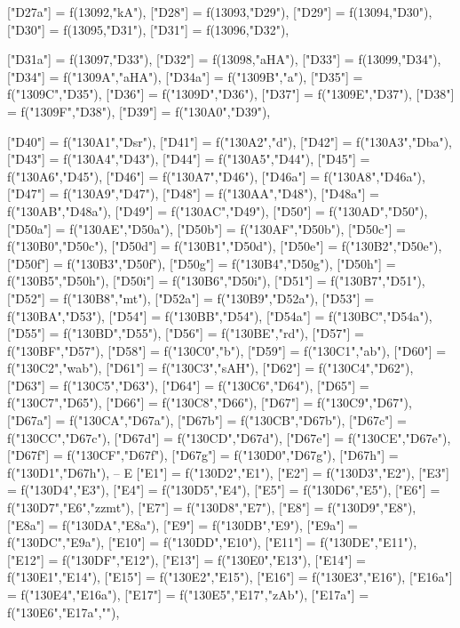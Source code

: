 \documentclass{article}
\begin{document}
\begin{luacode*}
{	["D27a"] = f(13092,"kA"),
	["D28"] = f(13093,"D29"),
	["D29"] = f(13094,"D30"),
	["D30"] = f(13095,"D31"),
	["D31"] = f(13096,"D32"),
  
	["D31a"] = f(13097,"D33"),
	["D32"] = f(13098,"aHA"),
	["D33"] = f(13099,"D34"),
	["D34"] = f("1309A","aHA"),
	["D34a"] = f("1309B","a"),
	["D35"] = f("1309C","D35"),
	["D36"] = f("1309D","D36"),
	["D37"] = f("1309E","D37"),
	["D38"] = f("1309F","D38"),
	["D39"] = f("130A0","D39"),

	["D40"] = f("130A1","Dsr"),
	["D41"] = f("130A2","d"),
	["D42"] = f("130A3","Dba"),
	["D43"] = f("130A4","D43"),
	["D44"] = f("130A5","D44"),
	["D45"] = f("130A6","D45"),
	["D46"] = f("130A7","D46"),
	["D46a"] = f("130A8","D46a"),
	["D47"] = f("130A9","D47"),
	["D48"] = f("130AA","D48"),
	["D48a"] = f("130AB","D48a"),
	["D49"] = f("130AC","D49"),
	["D50"] = f("130AD","D50"),
	["D50a"] = f("130AE","D50a"),
	["D50b"] = f("130AF","D50b"),
	["D50c"] = f("130B0","D50c"),
	["D50d"] = f("130B1","D50d"),
	["D50e"] = f("130B2","D50e"),
	["D50f"] = f("130B3","D50f"),
	["D50g"] = f("130B4","D50g"),
	["D50h"] = f("130B5","D50h"),
	["D50i"] = f("130B6","D50i"),
	["D51"] = f("130B7","D51"),
	["D52"] = f("130B8","mt"),
	["D52a"] = f("130B9","D52a"),
	["D53"] = f("130BA","D53"),
	["D54"] = f("130BB","D54"),
	["D54a"] = f("130BC","D54a"),
	["D55"] = f("130BD","D55"),
	["D56"] = f("130BE","rd"),
	["D57"] = f("130BF","D57"),
	["D58"] = f("130C0","b"),
	["D59"] = f("130C1","ab"),
	["D60"] = f("130C2","wab"),
	["D61"] = f("130C3","sAH"),
	["D62"] = f("130C4","D62"),
	["D63"] = f("130C5","D63"),
	["D64"] = f("130C6","D64"),
	["D65"] = f("130C7","D65"),
	["D66"] = f("130C8","D66"),
	["D67"] = f("130C9","D67"),
	["D67a"] = f("130CA","D67a"),
	["D67b"] = f("130CB","D67b"),
	["D67c"] = f("130CC","D67c"),
	["D67d"] = f("130CD","D67d"),
	["D67e"] = f("130CE","D67e"),
	["D67f"] = f("130CF","D67f"),
	["D67g"] = f("130D0","D67g"),
	["D67h"] = f("130D1","D67h"),
-- E 
   ["E1"] = f("130D2","E1"),
   ["E2"] = f("130D3","E2"),
   ["E3"] = f("130D4","E3"),
   ["E4"] = f("130D5","E4"),
   ["E5"] = f("130D6","E5"),
	["E6"] = f("130D7","E6","zzmt"),
   ["E7"] = f("130D8","E7"),
   ["E8"] = f("130D9","E8"),
   ["E8a"] = f("130DA","E8a"),
   ["E9"] = f("130DB","E9"),
   ["E9a"] = f("130DC","E9a"),
   ["E10"] = f("130DD","E10"),
["E11"] = f("130DE","E11"),
["E12"] = f("130DF","E12"),
["E13"] = f("130E0","E13"),
["E14"] = f("130E1","E14"),
["E15"] = f("130E2","E15"),
["E16"] = f("130E3","E16"),
["E16a"] = f("130E4","E16a"),
["E17"] = f("130E5","E17","zAb"),
["E17a"] = f("130E6","E17a",""),

}
\end{luacode*}
\end{document}
